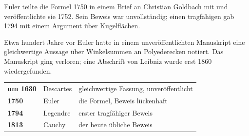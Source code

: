 \begin{geschichte}
Euler teilte die Formel 1750 in einem Brief an Christian Goldbach mit und veröffentlichte sie 1752. Sein Beweis war unvollständig; einen tragfähigen gab  1794 mit einem Argument über Kugelflächen.

Etwa hundert Jahre vor Euler hatte  in einem unveröffentlichten Manuskript eine gleichwertige Aussage über Winkelsummen an Polyederecken notiert. Das Manuskript ging verloren; eine Abschrift von Leibniz wurde erst 1860 wiedergefunden.

\begin{center}
{\small
\renewcommand{\arraystretch}{1.42}
\begin{tabular}{@{}P{1.6cm}P{2.4cm}P{3.8cm}@{}}
\toprule
\textbf{um 1630} & Descartes & gleichwertige Fassung, unveröffentlicht\\
\textbf{1750} & Euler & die Formel, Beweis lückenhaft\\
\textbf{1794} & Legendre & erster tragfähiger Beweis\\
\textbf{1813} & Cauchy & der heute übliche Beweis\\
\bottomrule
\end{tabular}}
\end{center}

\begin{center}
\begin{minipage}{0.9\textwidth}
\end{minipage}
\end{center}
\end{geschichte}

